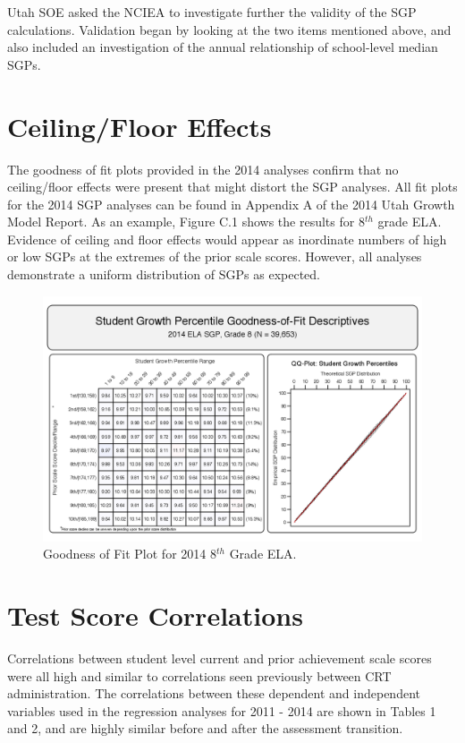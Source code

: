 \documentclass[12pt]{article}
\begin{document}
Utah SOE asked the NCIEA to investigate further the validity of the SGP
calculations. Validation began by looking at the two items mentioned
above, and also included an investigation of the annual relationship of
school-level median SGPs.

\pagebreak

\section{Ceiling/Floor Effects}\label{ceilingfloor-effects}

The goodness of fit plots provided in the 2014 analyses confirm that no
ceiling/floor effects were present that might distort the SGP analyses.
All fit plots for the 2014 SGP analyses can be found in Appendix A of
the 2014 Utah Growth Model Report. As an example, Figure C.1 shows the
results for 8\(^{th}\) grade ELA. Evidence of ceiling and floor effects
would appear as inordinate numbers of high or low SGPs at the extremes
of the prior scale scores. However, all analyses demonstrate a uniform
distribution of SGPs as expected.

\begin{figure}[htbp]
\centering
\includegraphics{../img/Goodness_of_Fit/ELA.2014/gofSGP_Grade_8.png}
\caption{Goodness of Fit Plot for 2014 8\(^{th}\) Grade ELA.}
\end{figure}

\pagebreak

\section{Test Score Correlations}\label{test-score-correlations}

Correlations between student level current and prior achievement scale
scores were all high and similar to correlations seen previously between
CRT administration. The correlations between these dependent and
independent variables used in the regression analyses for 2011 - 2014
are shown in Tables 1 and 2, and are highly similar before and after the
assessment transition.
\end{document}
